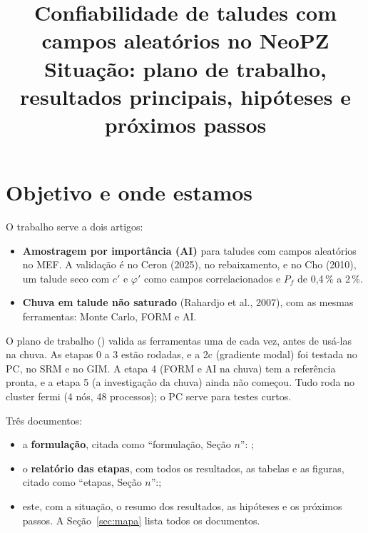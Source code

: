 \documentclass[11pt,a4paper]{article}
\title{Confiabilidade de taludes com campos aleatórios no NeoPZ\\\large Situação: plano de trabalho, resultados
principais, hipóteses e próximos passos}
\date{\versao}
\begin{document}
\maketitle
\tableofcontents

\section{Objetivo e onde estamos}
O trabalho serve a dois artigos:
\begin{itemize}
  \item \textbf{Amostragem por importância (AI)} para taludes com campos aleatórios no MEF. A validação é no Ceron (2025),
    no rebaixamento, e no Cho (2010), um talude seco com $c'$ e $\varphi'$ como campos correlacionados e $P_f$ de 0,4\,\% a
    2\,\%.
  \item \textbf{Chuva em talude não saturado} (Rahardjo et al., 2007), com as mesmas ferramentas: Monte Carlo, FORM e AI.
\end{itemize}
O plano de trabalho () valida as ferramentas uma de cada vez, antes de usá-las
na chuva. As etapas 0 a 3 estão rodadas, e a 2c (gradiente modal) foi testada no PC, no SRM e no GIM. A etapa 4 (FORM e
AI na chuva) tem a referência pronta, e a etapa 5 (a investigação da chuva) ainda não começou. Tudo roda no cluster
fermi (4 nós, 48 processos); o PC serve para testes curtos.

Três documentos:
\begin{itemize}
  \item a \textbf{formulação}, citada como ``formulação, Seção $n$'':\newline
    ;
  \item o \textbf{relatório das etapas}, com todos os resultados, as tabelas e as figuras, citado como ``etapas, Seção
    $n$'':\newline {};
  \item este, com a situação, o resumo dos resultados, as hipóteses e os próximos passos. A Seção~\ref{sec:mapa} lista
    todos os documentos.
\end{itemize}
\end{document}
